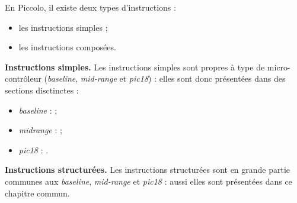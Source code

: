 


\thispagestyle{empty}

En Piccolo, il existe deux types d'instructions :
\begin{itemize}
  \item les instructions simples ;
  \item les instructions composées.
\end{itemize}

\textbf{Instructions simples.} Les instructions simples sont propres à type de micro-contrôleur (\emph{baseline}, \emph{mid-range} et \emph{pic18}) : elles sont donc présentées dans des sections disctinctes :
\begin{itemize}
  \item \emph{baseline} :  ;
  \item \emph{midrange} :  ;
  \item \emph{pic18} : .
\end{itemize}


\textbf{Instructions structurées.} Les instructions structurées sont en grande partie communes aux \emph{baseline}, \emph{mid-range} et \emph{pic18} : aussi elles sont présentées dans ce chapitre commun.

